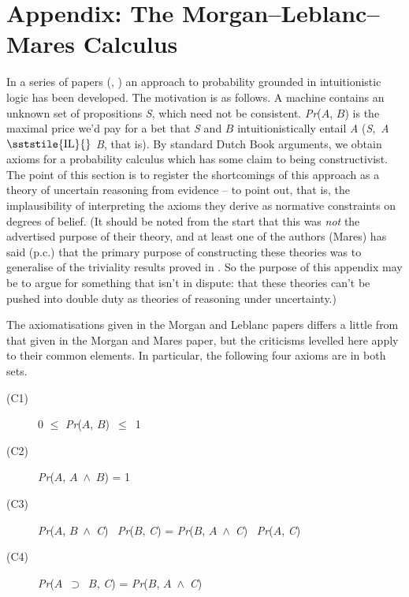 \section*{Appendix: The Morgan--Leblanc--Mares Calculus}
In a series of papers (\citet{MorganLeBlanc1983a, MorganLeBlanc1983b}, \citet{MorganMares1995}) an approach to probability grounded in intuitionistic logic has been developed. The motivation is as follows. A machine contains an unknown set of propositions \textit{S}, which need not be consistent. \textit{Pr}(\(A\), \(B\)) is the maximal price we'd pay for a bet that \textit{S} and \(B\) intuitionistically entail \textit{A }(\textit{S},~\textit{A }{\small \(\sststile{\mathrm{IL}}{}\)}\textit{ B}, that is). By standard Dutch Book arguments, we obtain axioms for a probability calculus which has some claim to being constructivist. The point of this section is to register the shortcomings of this approach as a theory of uncertain reasoning from evidence -- to point out, that is, the implausibility of interpreting the axioms they derive as normative constraints on degrees of belief. (It should be noted from the start that this was \textit{not} the advertised purpose of their theory, and at least one of the authors (Mares) has said (p.c.) that the primary purpose of constructing these theories was to generalise of the triviality results proved in \citet{Lewis1976b}. So the purpose of this appendix may be to argue for something that isn't in dispute: that these theories can't be pushed into double duty as theories of reasoning under uncertainty.)


The axiomatisations given in the Morgan and Leblanc papers differs a little from that given in the Morgan and Mares paper, but the criticisms levelled here apply to their common elements. In particular, the following four axioms are in both sets.

\begin{description}
\item[(C1)] 0 ${\leq}$ \textit{Pr}(\(A\), \(B\))~${\leq}$~1
\item[(C2)] \textit{Pr}(\(A\), \(A\)~${\wedge}$~\(B\)) = 1
\item[(C3)]\textit{Pr}(\(A\), \(B\)~${\wedge}$~\textit{C})~{\textperiodcentered} \textit{Pr}(\(B\), \textit{C}) = \textit{Pr}(\(B\), \(A\)~${\wedge}$~\textit{C})~{\textperiodcentered} \textit{Pr}(\(A\), \textit{C})
\item[(C4)]\textit{Pr}(\(A\)~${\supset}$~\(B\), \textit{C}) = \textit{Pr}(\(B\), \(A\)~${\wedge}$~\textit{C})
\end{description}

